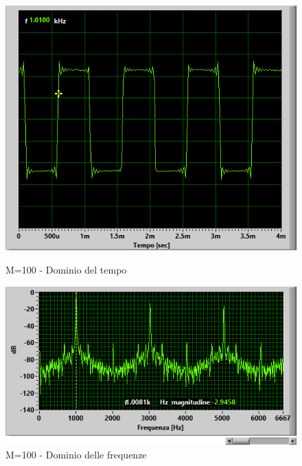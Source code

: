 \documentclass{article}
\begin{document}
\begin{figure}[H]
   \begin{minipage}{0.48\textwidth}
     \centering
     \includegraphics[width=1\linewidth]{m100}
     \caption{M=100 - Dominio del tempo}\label{Fig:Data1}
   \end{minipage}\hfill
   \begin{minipage}{0.48\textwidth}
     \centering
     \includegraphics[width=1\linewidth]{m100f}
     \caption{M=100 - Dominio delle frequenze}\label{Fig:Data2}
   \end{minipage}
\end{figure}
\end{document}
